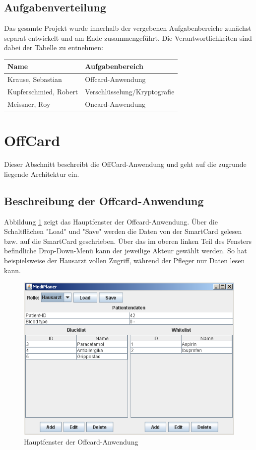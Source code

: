 \documentclass[parskip]{scrartcl}
\begin{document}
		\subsection{Aufgabenverteilung}
		Das gesamte Projekt wurde innerhalb der vergebenen Aufgabenbereiche zunächst separat entwickelt und am Ende zusammengeführt. Die Verantwortlichkeiten sind dabei der Tabelle zu entnehmen:
		
				\begin{table}[H]
					\centering
					\begin{tabular}[c]{|l|l|}
						\hline Name & Aufgabenbereich \\ 
						\hline
						\hline Krause, Sebastian & Offcard-Anwendung \\ 
						\hline Kupferschmied, Robert & Verschlüsselung/Kryptografie \\ 
						\hline Meissner, Roy  & Oncard-Anwendung \\ 
						\hline 
					\end{tabular} 
				\end{table}		
		
	\section{OffCard}
		Dieser Abschnitt beschreibt die OffCard-Anwendung und geht auf die zugrunde liegende Architektur ein.
	
	\subsection{Beschreibung der Offcard-Anwendung}
			Abbildung \ref{fig:maingui} zeigt das Hauptfenster der Offcard-Anwendung. Über die Schaltflächen "Load" und "Save" werden die Daten von der SmartCard gelesen bzw. auf die SmartCard geschrieben. Über das im oberen linken Teil des Fensters befindliche Drop-Down-Menü kann der jeweilige Akteur gewählt werden. So hat beispielsweise der Hausarzt vollen Zugriff, während der Pfleger nur Daten lesen kann.
	
		\begin{figure}[H]
			\centering
			\includegraphics[width=.75\linewidth]{./maingui.png}
			\caption{Hauptfenster der Offcard-Anwendung}
			\label{fig:maingui}
		\end{figure}
		
\end{document}
